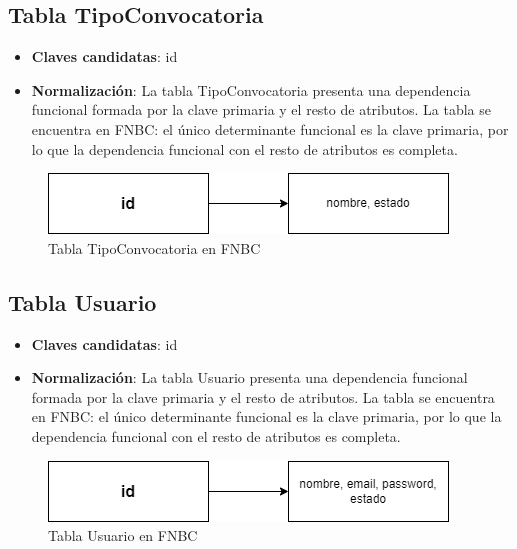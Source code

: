 \subsection{Tabla TipoConvocatoria}
    \begin{itemize}
        \item \textbf{Claves candidatas}: id
        \item \textbf{Normalización}: La tabla TipoConvocatoria presenta una dependencia funcional formada por la clave primaria y el resto de atributos. La tabla se encuentra en FNBC: el único determinante funcional es la clave primaria, por lo que la dependencia funcional con el resto de atributos es completa.
    \end{itemize}

\begin{figure}[H]
\centering
\includegraphics[scale=0.75]{img/diagramas/Datos/FNBC-TipoConvocatoria.png}
\caption{Tabla TipoConvocatoria en FNBC}\label{fig:Tabla TipoConvocatoria en FNBC}   
\end{figure}

\subsection{Tabla Usuario}
    \begin{itemize}
        \item \textbf{Claves candidatas}: id
        \item \textbf{Normalización}: La tabla Usuario presenta una dependencia funcional formada por la clave primaria y el resto de atributos. La tabla se encuentra en FNBC: el único determinante funcional es la clave primaria, por lo que la dependencia funcional con el resto de atributos es completa.
    \end{itemize}

\begin{figure}[H]
\centering
\includegraphics[scale=0.75]{img/diagramas/Datos/FNBC-Usuario.png}
\caption{Tabla Usuario en FNBC}\label{fig:Tabla Usuario en FNBC}   
\end{figure}

